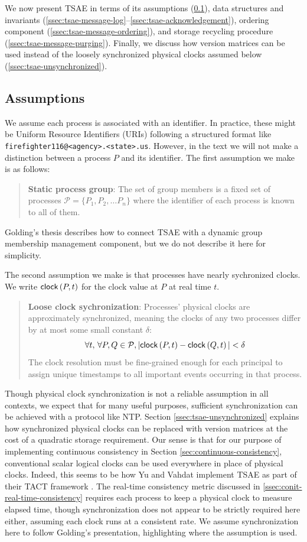 \documentclass[]             %
{NASA}                       %
\theoremstyle{definition}
\begin{document}
We now present TSAE in terms of its assumptions
(\ref{ssec:tsae-assumptions}), data structures and invariants
(\ref{ssec:tsae-message-log}--\ref{ssec:tsae-acknowledgement}),
ordering component (\ref{ssec:tsae-message-ordering}), and storage
recycling procedure (\ref{ssec:tsae-message-purging}). Finally, we
discuss how version matrices can be used instead of the loosely
synchronized physical clocks assumed below
(\ref{ssec:tsae-unsynchronized}).

\subsection{Assumptions}
\label{ssec:tsae-assumptions}
We assume each process is associated with an identifier. In practice,
these might be Uniform Resource Identifiers (URIs) \cite{rfc3986}
following a structured format like
\texttt{firefighter116@<agency>.<state>.us}. However, in the text we
will not make a distinction between a process $P$ and its
identifier. The first assumption we make is as follows:
\begin{quote}
  \textbf{Static process group}: The set of group members is a fixed
  set of processes $\mathcal{P} = \{P_1, P_2, \ldots P_n\}$ where the
  identifier of each process is known to all of them.
\end{quote}
Golding's thesis describes how to connect TSAE with a dynamic group
membership management component, but we do not describe it here for
simplicity.

The second assumption we make is that processes have nearly
sychronized clocks. We write $\mathsf{clock}\left(P, t\right)$ for the clock value at $P$
at real time $t$.
\begin{quote}
  \textbf{Loose clock sychronization}: Processes' physical clocks are approximately
  synchronized, meaning the clocks of any two processes differ by at
  most some small constant $\delta$:
  \[ \forall t,\, \forall P, Q \in \mathcal{P}, |\mathsf{clock}\left(P, t\right) - \mathsf{clock}\left(Q, t\right)| < \delta
  \]
  The clock resolution must be fine-grained enough for each principal
  to assign unique timestamps to all important events occurring in
  that process.
\end{quote}

Though physical clock synchronization is not a reliable assumption in
all contexts, we expect that for many useful purposes, sufficient
synchronization can be achieved with a protocol like NTP.  Section
\ref{ssec:tsae-unsynchronized} explains how synchronized physical
clocks can be replaced with version matrices at the cost of a
quadratic storage requirement. Our sense is that for our purpose of
implementing continuous consistency in Section
\ref{sec:continuous-consistency}, conventional scalar logical clocks
can be used everywhere in place of physical clocks. Indeed, this seems
to be how Yu and Vahdat implement TSAE as part of their TACT framework
\cite{2002tact}. The real-time consistency metric discussed in
\ref{ssec:conit-real-time-consistency} requires each process to keep a
physical clock to measure elapsed time, though synchronization does
not appear to be strictly required here either, assuming each clock
runs at a consistent rate. We assume synchronization here to follow
Golding's presentation, highlighting where the assumption is used.
\end{document}
